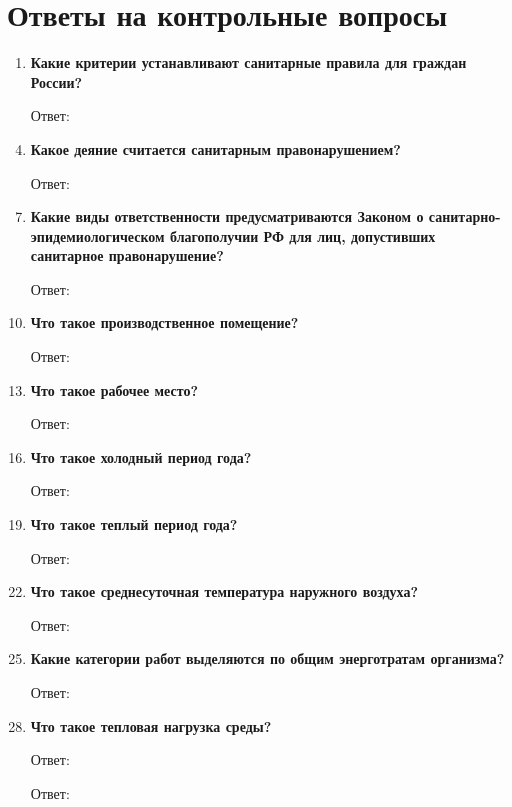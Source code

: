 \documentclass[a5paper, 12dd, twoside]{article}
\begin{document}
\section{Ответы на контрольные вопросы}
\begin{enumerate}
    \item {\bfseries Какие критерии устанавливают санитарные правила для граждан России?}
    \item [Ответ:]
    \item []
    \item {\bfseries Какое деяние считается санитарным правонарушением?}
    \item [Ответ:]
    \item []
    \item {\bfseries Какие виды ответственности предусматриваются Законом о санитарно-эпидемиологическом благополучии РФ для лиц, допустивших санитарное правонарушение?}
    \item [Ответ:]
    \item []
    \item {\bfseries Что такое производственное помещение?}
    \item [Ответ:]
    \item []
    \item {\bfseries Что такое рабочее место?}
    \item [Ответ:]
    \item []
    \item {\bfseries Что такое холодный период года?}
    \item [Ответ:]
    \item []
    \item {\bfseries Что такое теплый период года?}
    \item [Ответ:]
    \item []
    \item {\bfseries Что такое среднесуточная температура наружного воздуха?}
    \item [Ответ:]
    \item []
    \item {\bfseries Какие категории работ выделяются по общим энерготратам организма?}
    \item [Ответ:]
    \item []
    \item {\bfseries Что такое тепловая нагрузка среды?}
    \item [Ответ:]
    \item []
    \item [Ответ:]

\end{enumerate}
\end{document}
